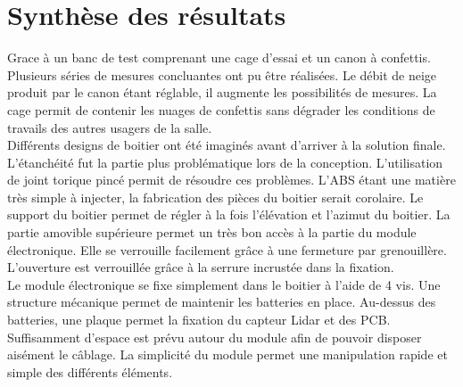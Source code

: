 
\section{Synthèse des résultats}

Grace à un banc de test comprenant une cage d’essai et un canon à confettis. Plusieurs séries de mesures 
concluantes ont pu être réalisées. Le débit de neige produit par le canon étant réglable, il augmente les 
possibilités de mesures. La cage permit de contenir les nuages de confettis sans dégrader les conditions 
de travails des autres usagers de la salle.\\
Différents designs de boitier ont été imaginés avant d’arriver à la solution finale. L’étanchéité fut la 
partie plus problématique lors de la conception. L’utilisation de joint torique pincé permit de résoudre 
ces problèmes. L’ABS étant une matière très simple à injecter, la fabrication des pièces du boitier serait 
corolaire. Le support du boitier permet de régler à la fois l’élévation et l’azimut du boitier. La partie 
amovible supérieure permet un très bon accès à la partie du module électronique. Elle se verrouille facilement 
grâce à une fermeture par grenouillère. L’ouverture est verrouillée grâce à la serrure incrustée dans la 
fixation.\\
Le module électronique se fixe simplement dans le boitier à l’aide de 4 vis. Une structure mécanique permet 
de maintenir les batteries en place. Au-dessus des batteries, une plaque permet la fixation du capteur Lidar 
et des PCB. Suffisamment d’espace est prévu autour du module afin de pouvoir disposer aisément le câblage. 
La simplicité du module permet une manipulation rapide et simple des différents éléments.